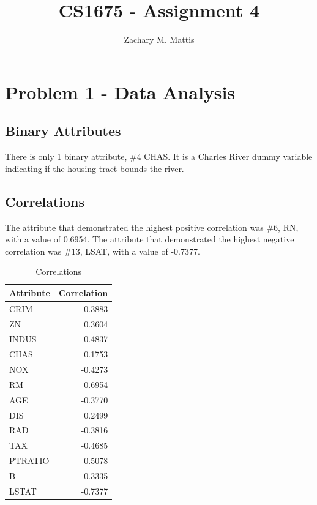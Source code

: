 \documentclass[12pt, letterpaper]{report}
\title{CS1675 - Assignment 4}
\author{Zachary M. Mattis}
\begin{document}
	
\maketitle

\section{Problem 1 - Data Analysis}

\subsection{Binary Attributes}

There is only 1 binary attribute, \#4 CHAS. It is a Charles River dummy variable indicating if the housing tract bounds the river.

\subsection{Correlations}

The attribute that demonstrated the highest positive correlation was \#6, RN, with a value of 0.6954. The attribute that demonstrated the highest negative correlation was \#13, LSAT, with a value of -0.7377.

\begin{table}[H]
	\centering
	\begin{tabular}{ |l|r| }
		\hline
		Attribute & Correlation \\
		\hline
		CRIM & -0.3883 \\
		\hline
		ZN & 0.3604 \\
		\hline
		INDUS & -0.4837 \\
		\hline
		CHAS & 0.1753 \\
		\hline
		NOX & -0.4273 \\
		\hline
		RM & 0.6954 \\
		\hline
		AGE & -0.3770 \\
		\hline
		DIS & 0.2499 \\
		\hline
		RAD & -0.3816 \\
		\hline
		TAX & -0.4685 \\
		\hline
		PTRATIO & -0.5078 \\
		\hline
		B & 0.3335 \\
		\hline
		LSTAT & -0.7377 \\
		\hline
	\end{tabular}
	\caption{Correlations}
\end{table}
\end{document}
